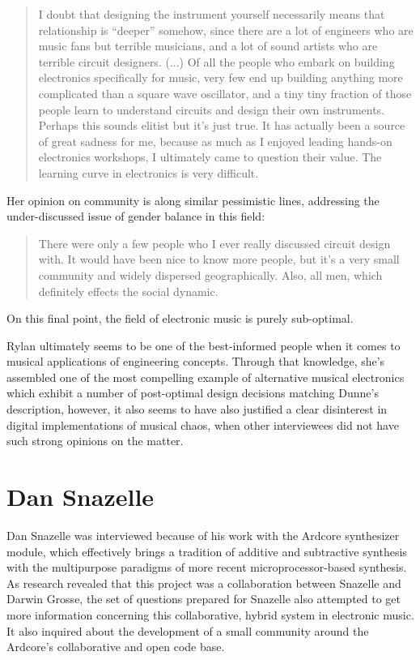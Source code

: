 \begin{quote}
	I doubt that designing the instrument yourself necessarily means that relationship is “deeper” somehow, since there are a lot of engineers who are music fans but terrible musicians, and a lot of sound artists who are terrible circuit designers. (...) Of all the people who embark on building electronics specifically for music, very few end up building anything more complicated than a square wave oscillator, and a tiny tiny fraction of those people learn to understand circuits and design their own instruments. Perhaps this sounds elitist but it’s just true. It has actually been a source of great sadness for me, because as much as I enjoyed leading hands-on electronics workshops, I ultimately came to question their value. The learning curve in electronics is very difficult.
\end{quote}

Her opinion on community is along similar pessimistic lines, addressing the under-discussed issue of gender balance in this field: 

\begin{quote}
	There were only a few people who I ever really discussed circuit design with. It would have been nice to know more people, but it’s a very small community and widely dispersed geographically. Also, all men, which definitely effects the social dynamic.
\end{quote} 

On this final point, the field of electronic music is purely sub-optimal. 

Rylan ultimately seems to be one of the best-informed people when it comes to musical applications of engineering concepts. Through that knowledge, she's assembled one of the most compelling example of alternative musical electronics which exhibit a number of post-optimal design decisions matching Dunne's description, however, it also seems to have also justified a clear disinterest in digital implementations of musical chaos, when other interviewees did not have such strong opinions on the matter. 

\section{Dan Snazelle}

Dan Snazelle was interviewed because of his work with the Ardcore synthesizer module, which effectively brings a tradition of additive and subtractive synthesis with the multipurpose paradigms of more recent microprocessor-based synthesis. As research revealed that this project was a collaboration between Snazelle and Darwin Grosse, the set of questions prepared for Snazelle also attempted to get more information concerning this collaborative, hybrid system in electronic music. It also inquired about the development of a small community around the Ardcore's collaborative and open code base. 

